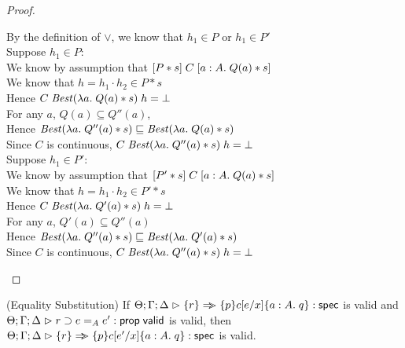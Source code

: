 \begin{proof}
\begin{tabbedproof}
    \oooooo By the definition of $\vee$, we know that $h_1 \in P$ or $h_1 \in P'$ \\
    \oooooo Suppose $h_1 \in P$: \\
    \ooooooo We know by assumption that $[{P * s}]\;{C}\;[{a:A}.\;{Q(a) * s}]$ \\
    \ooooooo We know that $h = h_1 \cdot h_2 \in P * s$ \\
    \ooooooo Hence $C\;\mathit{Best}(\lambda a.\;Q(a) * s)\;h = \bot$ \\
    \ooooooo For any $a$, $Q(a) \subseteq Q''(a)$, \\
    \ooooooo Hence $\mathit{Best}(\lambda a.\;Q''(a) * s) \sqsubseteq \mathit{Best}(\lambda a.\;Q(a) * s)$ \\ 
    \ooooooo Since $C$ is continuous, $C\;\mathit{Best}(\lambda a.\;Q''(a) * s)\;h = \bot$ \\
    \oooooo Suppose $h_1 \in P'$: \\
    \ooooooo We know by assumption that $[{P' * s}]\;{C}\;[{a:A}.\;{Q(a) * s}]$ \\
    \ooooooo We know that $h = h_1 \cdot h_2 \in P' * s$ \\
    \ooooooo Hence $C\;\mathit{Best}(\lambda a.\;Q'(a) * s)\;h = \bot$ \\
    \ooooooo For any $a$, $Q'(a) \subseteq Q''(a)$ \\
    \ooooooo Hence $\mathit{Best}(\lambda a.\;Q''(a) * s) \sqsubseteq \mathit{Best}(\lambda a.\;Q'(a) * s)$ \\
    \ooooooo Since $C$ is continuous, $C\;\mathit{Best}(\lambda a.\;Q''(a) * s)\;h = \bot$ \\
  \end{tabbedproof}
\end{proof}

\begin{lemma}{(Equality Substitution)}
If ${\Theta; \Gamma; \Delta} \vartriangleright {\{{r}\} \Rightarrow\!\!\!>\{{p}\}{c[e/x]}\{{a:A}.\;{q}\}} : \mathsf{spec}$ is valid and
${\Theta; \Gamma; \Delta} \vartriangleright {r \supset e =_A e'} : \mathsf{prop} \;\mathsf{valid}$ is valid, then ${\Theta; \Gamma; \Delta} \vartriangleright {\{{r}\} \Rightarrow\!\!\!>\{{p}\}{c[e'/x]}\{{a:A}.\;{q}\}} : \mathsf{spec}$ is valid.
\end{lemma}

